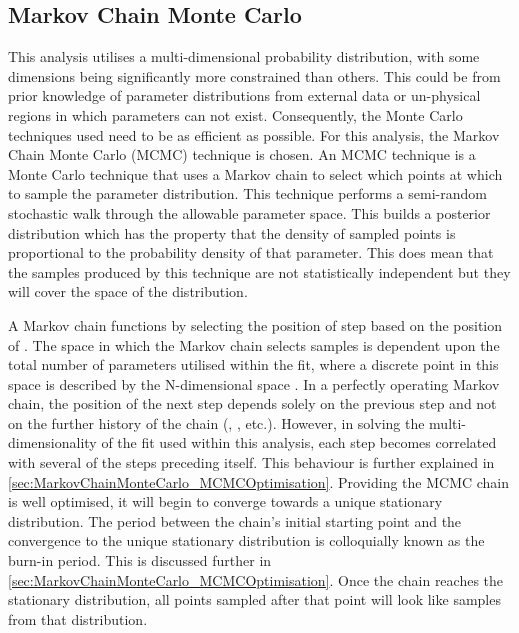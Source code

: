 \subsection{Markov Chain Monte Carlo}
\label{sec:MarkovChainMonteCarlo_MarkovChainMC}
This analysis utilises a multi-dimensional probability distribution, with some dimensions being significantly more constrained than others. This could be from prior knowledge of parameter distributions from external data or un-physical regions in which parameters can not exist. Consequently, the Monte Carlo techniques used need to be as efficient as possible. For this analysis, the Markov Chain Monte Carlo (MCMC) technique is chosen. An MCMC technique is a Monte Carlo technique that uses a Markov chain to select which points at which to sample the parameter distribution. This technique performs a semi-random stochastic walk through the allowable parameter space. This builds a posterior distribution which has the property that the density of sampled points is proportional to the probability density of that parameter. This does mean that the samples produced by this technique are not statistically independent but they will cover the space of the distribution.

A Markov chain functions by selecting the position of step  based on the position of . The space in which the Markov chain selects samples is dependent upon the total number of parameters utilised within the fit, where a discrete point in this space is described by the N-dimensional space . In a perfectly operating Markov chain, the position of the next step depends solely on the previous step and not on the further history of the chain (, , etc.). However, in solving the multi-dimensionality of the fit used within this analysis, each step becomes correlated with several of the steps preceding itself. This behaviour is further explained in \autoref{sec:MarkovChainMonteCarlo_MCMCOptimisation}. Providing the MCMC chain is well optimised, it will begin to converge towards a unique stationary distribution. The period between the chain's initial starting point and the convergence to the unique stationary distribution is colloquially known as the burn-in period. This is discussed further in \autoref{sec:MarkovChainMonteCarlo_MCMCOptimisation}. Once the chain reaches the stationary distribution, all points sampled after that point will look like samples from that distribution.


